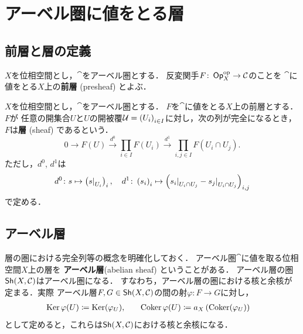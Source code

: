 \section{アーベル圏に値をとる層}

\subsection{前層と層の定義}

\begin{leftbar}
\begin{DFN}[前層]
    \(X\)を位相空間とし，\(\cat\)をアーベル圏とする．
    反変関手\(F\colon\Op_{X}^{\op}\to\cat\)のことを
    \(\cat\)に値をとる\(X\)上の\textbf{前層} (presheaf) とよぶ．
\end{DFN}
\end{leftbar}

\begin{leftbar}
\begin{DFN}[層]
    \(X\)を位相空間とし，\(\cat\)をアーベル圏とする．
    \(F\)を\(\cat\)に値をとる\(X\)上の前層とする．
    \(F\)が
    任意の開集合\(U\)と\(U\)の開被覆\(
            \cU=\left(U_i\right)_{i\in I}
    \)に対し，次の列が完全になるとき，
    \(F\)は\textbf{層} (sheaf) であるという．
    \[
        0\to F(U)\overset{d^0}{\to} 
        \prod_{i\in I}F(U_i)\overset{d^1}{\to} 
        \prod_{i,j\in I}F(U_{i}\cap U_j).
    \]ただし，\(d^0\), \(d^1\)は\[
        d^0\colon s\mapsto\left(\mres[s]{U_i}\right)_i,
        \quad
        d^1\colon \left(s_i\right)_i 
        \mapsto\left(
            \mres[s_i]{U_{i}\cap U_j}-\mres[s_j]{U_{i}\cap U_j}
        \right)_{i,j}
    \]で定める．    
\end{DFN}
\end{leftbar}
















\subsection{アーベル層}
層の圏における完全列等の概念を明確化しておく．
アーベル圏$\cat$に値を取る位相空間$X$上の層を
\textbf{アーベル層}(abelian sheaf) ということがある．
アーベル層の圏$\Sh(X,\cat)$はアーベル圏になる．
すなわち，アーベル層の圏における核と余核が定まる．実際
アーベル層$F,G\in\Sh(X,\cat)$の間の射$\varphi\colon F\to G$に対し，
\begin{alignat*}{2}
    \Ker\varphi(U)&\coloneqq\Ker(\varphi_U), 
    &\quad 
    \Coker\varphi(U)&\coloneqq a_X\left(\Coker(\varphi_U)\right)
\end{alignat*}
として定めると，これらは$\Sh(X,\cat)$における核と余核になる．

